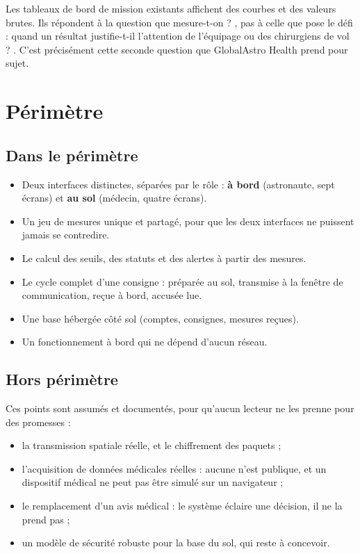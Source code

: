 \documentclass[11pt,a4paper]{article}
\let\sectionorig\section
\renewcommand{\section}{\Needspace{5\baselineskip}\sectionorig}
\begin{document}
Les tableaux de bord de mission existants affichent des courbes et des valeurs brutes. Ils
r\'epondent \`a la question \og que mesure-t-on ? \fg{}, pas \`a celle que pose le d\'efi :
\og quand un r\'esultat justifie-t-il l'attention de l'\'equipage ou des chirurgiens de vol ? \fg{}.
C'est pr\'ecis\'ement cette seconde question que GlobalAstro Health prend pour sujet.

\section{P\'erim\`etre}

\subsection{Dans le p\'erim\`etre}

\begin{itemize}
  \item Deux interfaces distinctes, s\'epar\'ees par le r\^ole : \textbf{\`a bord} (astronaute, sept
        \'ecrans) et \textbf{au sol} (m\'edecin, quatre \'ecrans).
  \item Un jeu de mesures unique et partag\'e, pour que les deux interfaces ne puissent jamais se
        contredire.
  \item Le calcul des seuils, des statuts et des alertes \`a partir des mesures.
  \item Le cycle complet d'une consigne : pr\'epar\'ee au sol, transmise \`a la fen\^etre de
        communication, re\c{c}ue \`a bord, accus\'ee lue.
  \item Une base h\'eberg\'ee c\^ot\'e sol (comptes, consignes, mesures re\c{c}ues).
  \item Un fonctionnement \`a bord qui ne d\'epend d'aucun r\'eseau.
\end{itemize}

\subsection{Hors p\'erim\`etre}

Ces points sont assum\'es et document\'es, pour qu'aucun lecteur ne les prenne pour des promesses :

\begin{itemize}
  \item la transmission spatiale r\'eelle, et le chiffrement des paquets ;
  \item l'acquisition de donn\'ees m\'edicales r\'eelles : aucune n'est publique, et un dispositif
        m\'edical ne peut pas \^etre simul\'e sur un navigateur ;
  \item le remplacement d'un avis m\'edical : le syst\`eme \'eclaire une d\'ecision, il ne la prend pas ;
  \item un mod\`ele de s\'ecurit\'e robuste pour la base du sol, qui reste \`a concevoir.
\end{itemize}
\end{document}
